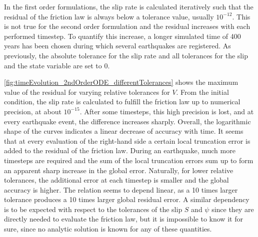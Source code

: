 In the first order formulations, the slip rate is calculated iteratively such that the residual of the friction law is always below a tolerance value, usually $10^{-12}$. This is not true for the second order formulation and the residual increases with each performed timestep. To quantify this increase, a longer simulated time of 400 years has been chosen during which several earthquakes are registered. As previously, the absolute tolerance for the slip rate and all tolerances for the slip and the state variable are set to 0.

\autoref{fig:timeEvolution_2ndOrderODE_differentTolerances} shows the maximum value of the residual for varying relative tolerances for $V$. From the initial condition, the slip rate is calculated to fulfill the friction law up to numerical precision, at about $10^{-15}$. After some timesteps, this high precision is lost, and at every earthquake event, the difference increases sharply. Overall, the logarithmic shape of the curves indicates a linear decrease of accuracy with time. It seems that at every evaluation of the right-hand side a certain local truncation error is added to the residual of the friction law. During an earthquake, much more timesteps are required and the sum of the local truncation errors sum up to form an apparent sharp increase in the global error. Naturally, for lower relative tolerances, the additional error at each timestep is smaller and the global accuracy is higher. The relation seems to depend linear, as a 10 times larger tolerance produces a 10 times larger global residual error. A similar dependency is to be expected with respect to the tolerances of the slip $S$ and $\psi$ since they are directly needed to evaluate the friction law, but it is impossible to know it for sure, since no analytic solution is known for any of these quantities.

